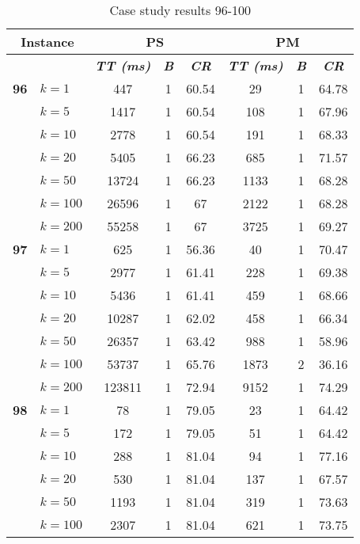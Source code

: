     \begin{table}[htbp]
    \caption{Case study results 96-100}
    \centering
    \begin{tabular}{|l|l|c|c|c|c|c|c|}
    \hline
    \multicolumn{ 2}{|c|}{\textbf{Instance}} & \multicolumn{ 3}{c|}{\textbf{PS}} & \multicolumn{ 3}{c|}{\textbf{PM}} \\ \hline
    \multicolumn{ 2}{|l|}{} & \textbf{\textit{TT (ms)}} & \textbf{\textit{B}} & \textbf{\textit{CR}} & \textbf{\textit{TT (ms)}} & \textbf{\textit{B}} & \textbf{\textit{CR}} \\ \hline
    \multicolumn{1}{|r|}{\textbf{96}} & $k=1$ & 447 & 1 & 60.54 & 29 & 1 & 64.78 \\ 
     & $k=5$ & 1417 & 1 & 60.54 & 108 & 1 & 67.96 \\ 
     & $k=10$ & 2778 & 1 & 60.54 & 191 & 1 & 68.33 \\ 
     & $k=20$ & 5405 & 1 & 66.23 & 685 & 1 & 71.57 \\ 
     & $k=50$ & 13724 & 1 & 66.23 & 1133 & 1 & 68.28 \\ 
     & $k=100$ & 26596 & 1 & 67 & 2122 & 1 & 68.28 \\ 
     & $k=200$ & 55258 & 1 & 67 & 3725 & 1 & 69.27 \\ \hline
    \multicolumn{1}{|r|}{\textbf{97}} & $k=1$ & 625 & 1 & 56.36 & 40 & 1 & 70.47 \\ 
     & $k=5$ & 2977 & 1 & 61.41 & 228 & 1 & 69.38 \\ 
     & $k=10$ & 5436 & 1 & 61.41 & 459 & 1 & 68.66 \\ 
     & $k=20$ & 10287 & 1 & 62.02 & 458 & 1 & 66.34 \\ 
     & $k=50$ & 26357 & 1 & 63.42 & 988 & 1 & 58.96 \\ 
     & $k=100$ & 53737 & 1 & 65.76 & 1873 & 2 & 36.16 \\ 
     & $k=200$ & 123811 & 1 & 72.94 & 9152 & 1 & 74.29 \\ \hline
    \multicolumn{1}{|r|}{\textbf{98}} & $k=1$ & 78 & 1 & 79.05 & 23 & 1 & 64.42 \\ 
     & $k=5$ & 172 & 1 & 79.05 & 51 & 1 & 64.42 \\ 
     & $k=10$ & 288 & 1 & 81.04 & 94 & 1 & 77.16 \\ 
     & $k=20$ & 530 & 1 & 81.04 & 137 & 1 & 67.57 \\ 
     & $k=50$ & 1193 & 1 & 81.04 & 319 & 1 & 73.63 \\ 
     & $k=100$ & 2307 & 1 & 81.04 & 621 & 1 & 73.75 \\ 

\end{tabular}
\end{table}
